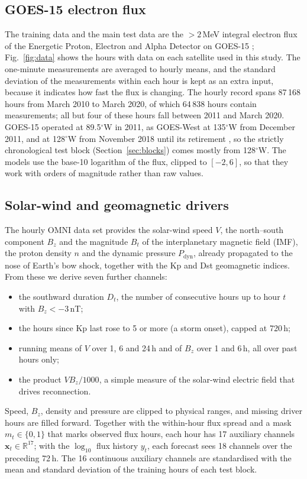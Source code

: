 \documentclass[a4paper,fleqn]{cas-dc}
\begin{document}
\subsection{GOES-15 electron flux}
The training data and the main test data are the \(>2\)\,MeV integral electron flux of the Energetic Proton,
Electron and Alpha Detector on GOES-15 \citep{goes15_epead}; Fig.~\ref{fig:data} shows the hours with data on
each satellite used in this study. The one-minute measurements are averaged to hourly
means, and the standard deviation of the measurements within each hour is kept as an extra input, because it
indicates how fast the flux is changing. The hourly record spans 87\,168 hours from March 2010 to March 2020, of
which 64\,838 hours contain measurements; all but four of these hours fall between 2011 and March 2020.
GOES-15 operated at 89.5\(^\circ\)W in 2011, as GOES-West at 135\(^\circ\)W from December 2011, and at
128\(^\circ\)W from November 2018 until its retirement \citep{ospo2018}, so the strictly chronological test
block (Section~\ref{sec:blocks}) comes mostly from 128\(^\circ\)W. The models use the base-10 logarithm of the
flux, clipped to \([-2, 6]\), so that they work with orders of magnitude rather than raw values.

\subsection{Solar-wind and geomagnetic drivers}
The hourly OMNI data set \citep{king2005,omni2020} provides the solar-wind speed \(V\), the north--south component
\(B_z\) and the magnitude \(B_t\) of the interplanetary magnetic field (IMF), the proton density \(n\) and the
dynamic pressure \(P_\mathrm{dyn}\), already propagated to the nose of Earth's bow shock, together with the Kp
and Dst geomagnetic indices. From these we derive seven further channels:
\begin{itemize}
\item the southward duration \(D_t\), the number of consecutive hours up to hour \(t\) with \(B_z<-3\)\,nT;
\item the hours since Kp last rose to 5 or more (a storm onset), capped at 720\,h;
\item running means of \(V\) over 1, 6 and 24\,h and of \(B_z\) over 1 and 6\,h, all over past hours only;
\item the product \(VB_z/1000\), a simple measure of the solar-wind electric field that drives reconnection.
\end{itemize}
Speed, \(B_z\), density and pressure are clipped to physical ranges, and missing driver hours are filled forward.
Together with the within-hour flux spread and a mask \(m_t\in\{0,1\}\) that marks observed flux hours, each hour
has 17 auxiliary channels \(\mathbf x_t\in\mathbb R^{17}\); with the \(\log_{10}\) flux history \(y_t\), each
forecast sees 18 channels over the preceding 72\,h. The 16 continuous auxiliary channels are standardised with the
mean and standard deviation of the training hours of each test block.
\end{document}
